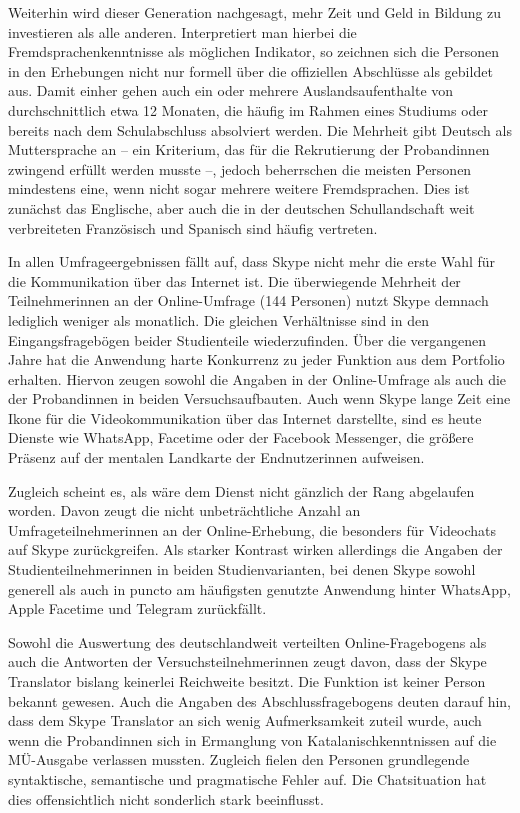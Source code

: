 Weiterhin wird dieser Generation nachgesagt, mehr Zeit und Geld in Bildung zu investieren als alle anderen. Interpretiert man hierbei die Fremdsprachenkenntnisse als möglichen Indikator, so zeichnen sich die Personen in den Erhebungen nicht nur formell über die offiziellen Abschlüsse als gebildet aus. Damit einher gehen auch ein oder mehrere Auslandsaufenthalte von durchschnittlich etwa 12 Monaten, die häufig im Rahmen eines Studiums oder bereits nach dem Schulabschluss absolviert werden. Die Mehrheit gibt Deutsch als Muttersprache an -- ein Kriterium, das für die Rekrutierung der {Proband{\textperiodcentered}innen} zwingend erfüllt werden musste --, jedoch beherrschen die meisten Personen mindestens eine, wenn nicht sogar mehrere weitere Fremdsprachen. Dies ist zunächst das Englische, aber auch die in der deutschen Schullandschaft weit verbreiteten Französisch und Spanisch sind häufig vertreten. 

In allen Umfrageergebnissen fällt auf, dass Skype nicht mehr die erste Wahl für die Kommunikation über das Internet ist. Die überwiegende Mehrheit der Teilnehmer{\textperiodcentered}innen an der Online-Umfrage (144 Personen) nutzt Skype demnach lediglich weniger als monatlich. Die gleichen Verhältnisse sind in den Eingangsfragebögen beider Studienteile wiederzufinden. Über die vergangenen Jahre hat die Anwendung harte Konkurrenz zu jeder Funktion aus dem Portfolio erhalten. Hiervon zeugen sowohl die Angaben in der Online-Umfrage als auch die der Proband{\textperiodcentered}innen in beiden Versuchsaufbauten. Auch wenn Skype lange Zeit eine Ikone für die Videokommunikation über das Internet darstellte, sind es heute Dienste wie WhatsApp, Facetime oder der Facebook Messenger, die größere Präsenz auf der mentalen Landkarte der Endnutzer{\textperiodcentered}innen aufweisen.

Zugleich scheint es, als wäre dem Dienst nicht gänzlich der Rang abgelaufen worden. Davon zeugt die nicht unbeträchtliche Anzahl an Umfrageteilnehmer{\textperiodcentered}innen an der Online-Erhebung, die besonders für Videochats auf Skype zurückgreifen. Als starker Kontrast wirken allerdings die Angaben der Studienteilnehmer{\textperiodcentered}innen in beiden Studienvarianten, bei denen Skype sowohl generell als auch in puncto am häufigsten genutzte Anwendung hinter WhatsApp, Apple Facetime und Telegram zurückfällt.

Sowohl die Auswertung des deutschlandweit verteilten Online-Fragebogens als auch die Antworten der Versuchsteilnehmer{\textperiodcentered}innen zeugt davon, dass der Skype Translator bislang keinerlei Reichweite besitzt. Die Funktion ist keiner Person bekannt gewesen. Auch die Angaben des Abschlussfragebogens deuten darauf hin, dass dem Skype Translator an sich wenig Aufmerksamkeit zuteil wurde, auch wenn die Proband{\textperiodcentered}innen sich in Ermanglung von Katalanischkenntnissen auf die MÜ-Ausgabe verlassen mussten. Zugleich fielen den Personen grundlegende syntaktische, semantische und pragmatische Fehler auf. Die Chatsituation hat dies offensichtlich nicht sonderlich stark beeinflusst. 

